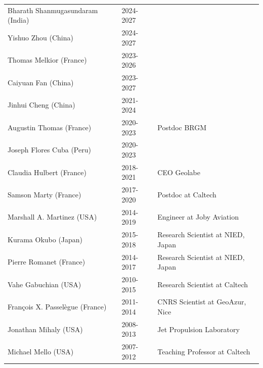 \documentclass[10pt]{article}
\begin{document}
\begin{table}[h!]
\begin{tabular}{L{6cm}L{2cm}D{7cm}}
\color{groy}Bharath Shanmugasundaram (India)    & 2024-2027&   \\
\color{groy}Yishuo Zhou (China)           		& 2024-2027&   \\
\color{groy}Thomas Melkior (France)       		& 2023-2026&   \\
\color{groy}Caiyuan Fan (China)          		& 2023-2027&   \\
\color{groy}Jinhui Cheng (China)         		& 2021-2024&   \\
\color{gray}Augustin Thomas (France)      		& 2020-2023&   Postdoc BRGM \\
\color{gray}Joseph Flores Cuba (Peru)   		& 2020-2023&   \\
\color{gray}Claudia Hulbert (France)   	  		& 2018-2021&  CEO Geolabe\\
\color{gray}Samson Marty (France)    	      	& 2017-2020&  Postdoc at Caltech\\
\color{gray}Marshall A. Martinez (USA)  		& 2014-2019&  Engineer at Joby Aviation \\
\color{gray}Kurama Okubo (Japan)   	      		& 2015-2018&  Research Scientist at NIED, Japan\\
\color{gray}Pierre Romanet (France)        		& 2014-2017&  Research Scientist at NIED, Japan\\
\color{gray}Vahe Gabuchian (USA)       			& 2010-2015&  Research Scientist at Caltech\\
\color{gray}François X. Passelègue (France)		& 2011-2014&  CNRS Scientist at GeoAzur, Nice\\
\color{gray}Jonathan Mihaly (USA)        		& 2008-2013&  Jet Propulsion Laboratory\\
\color{gray}Michael Mello (USA)          		& 2007-2012&  Teaching Professor at Caltech\\[16pt]
\end{tabular}



\end{table}
\end{document}
